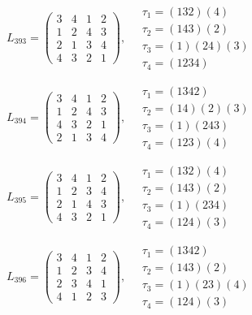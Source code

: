 $L_{393} = \begin{pmatrix} 3 & 4 & 1 & 2 \\ 1 & 2 & 4 & 3 \\ 2 & 1 & 3 & 4 \\ 4 & 3 & 2 & 1 \end{pmatrix}, \quad \begin{matrix} \tau_{1} = (1 3 2)(4) \\ \tau_{2} = (1 4 3)(2) \\ \tau_{3} = (1)(2 4)(3) \\ \tau_{4} = (1 2 3 4) \end{matrix}$

$L_{394} = \begin{pmatrix} 3 & 4 & 1 & 2 \\ 1 & 2 & 4 & 3 \\ 4 & 3 & 2 & 1 \\ 2 & 1 & 3 & 4 \end{pmatrix}, \quad \begin{matrix} \tau_{1} = (1 3 4 2) \\ \tau_{2} = (1 4)(2)(3) \\ \tau_{3} = (1)(2 4 3) \\ \tau_{4} = (1 2 3)(4) \end{matrix}$

$L_{395} = \begin{pmatrix} 3 & 4 & 1 & 2 \\ 1 & 2 & 3 & 4 \\ 2 & 1 & 4 & 3 \\ 4 & 3 & 2 & 1 \end{pmatrix}, \quad \begin{matrix} \tau_{1} = (1 3 2)(4) \\ \tau_{2} = (1 4 3)(2) \\ \tau_{3} = (1)(2 3 4) \\ \tau_{4} = (1 2 4)(3) \end{matrix}$

$L_{396} = \begin{pmatrix} 3 & 4 & 1 & 2 \\ 1 & 2 & 3 & 4 \\ 2 & 3 & 4 & 1 \\ 4 & 1 & 2 & 3 \end{pmatrix}, \quad \begin{matrix} \tau_{1} = (1 3 4 2) \\ \tau_{2} = (1 4 3)(2) \\ \tau_{3} = (1)(2 3)(4) \\ \tau_{4} = (1 2 4)(3) \end{matrix}$

